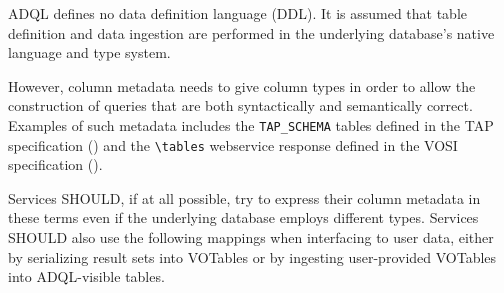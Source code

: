 \documentclass[11pt,a4paper]{ivoa}
\begin{document}
ADQL defines no data definition language (DDL).
It is assumed that table definition and data ingestion are performed in
the underlying database's native language and type system.

However, column metadata needs to give column types in order to allow the
construction of queries that are both syntactically and semantically correct.
Examples of such metadata includes the \verb:TAP_SCHEMA: tables defined
in the TAP specification (\citet{std:TAP}) and the \verb:\tables:
webservice response defined in the VOSI specification (\citet{std:VOSI}).

Services SHOULD, if at all possible, try to express their column metadata in
these terms even if the underlying database employs different types.
Services SHOULD also use the following mappings when interfacing to user data,
either by serializing result sets into VOTables or by ingesting user-provided
VOTables into ADQL-visible tables.
\end{document}
